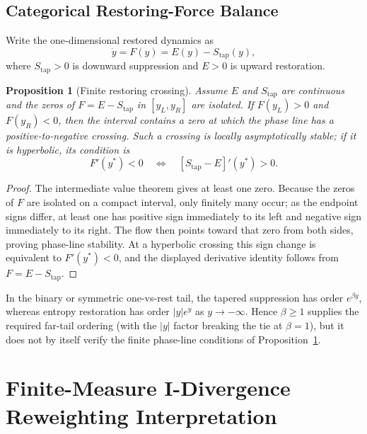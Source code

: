 \documentclass{article}
\theoremstyle{plain}
\newtheorem{proposition}[theorem]{Proposition}
\theoremstyle{definition}
\theoremstyle{remark}
\begin{document}
\subsection{Categorical Restoring-Force Balance}
\label{app:categorical_restoring_balance}

Write the one-dimensional restored dynamics as
\[
\dot y=F(y)=E(y)-S_{\mathrm{tap}}(y),
\]
where \(S_{\mathrm{tap}}>0\) is downward suppression and \(E>0\) is
upward restoration.

\begin{proposition}[Finite restoring crossing]
\label{prop:categorical_restoring_crossing}
Assume \(E\) and \(S_{\mathrm{tap}}\) are continuous and the zeros of
\(F=E-S_{\mathrm{tap}}\) in \([y_L,y_R]\) are isolated. If
\(F(y_L)>0\) and \(F(y_R)<0\), then the interval contains a zero at
which the phase line has a positive-to-negative crossing. Such a
crossing is locally asymptotically stable; if it is hyperbolic, its
condition is
\[
F'(y^*)<0
\quad\Longleftrightarrow\quad
[S_{\mathrm{tap}}-E]'(y^*)>0.
\]
\end{proposition}

\begin{proof}
The intermediate value theorem gives at least one zero. Because the
zeros of \(F\) are isolated on a compact interval, only finitely many occur; as
the endpoint signs differ, at least one has positive sign immediately
to its left and negative sign immediately to its right. The flow then
points toward that zero from both sides, proving phase-line stability. At a
hyperbolic crossing this sign change is equivalent to \(F'(y^*)<0\),
and the displayed derivative identity follows from \(F=E-S_{\mathrm{tap}}\).
\end{proof}

In the binary or symmetric one-vs-rest tail, the tapered suppression
has order \(e^{\beta y}\), whereas entropy restoration has order
\(|y|e^y\) as \(y\to-\infty\). Hence \(\beta\ge1\) supplies the
required far-tail ordering (with the \(|y|\) factor breaking the tie at
\(\beta=1\)), but it does not by itself verify the finite phase-line
conditions of Proposition~\ref{prop:categorical_restoring_crossing}.

\section{Finite-Measure I-Divergence Reweighting Interpretation}
\label{app:distributional_reweighting}
\label{app:finite_measure_variational}
\end{document}
